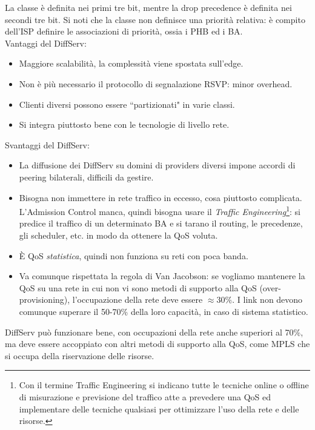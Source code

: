 La classe è definita nei primi tre bit, mentre la drop precedence è definita nei secondi tre bit. Si noti che la classe non definisce una priorità relativa: è compito dell'ISP definire le associazioni di priorità, ossia i PHB ed i BA.\\
Vantaggi del DiffServ:
\begin{itemize}
	\item Maggiore scalabilità, la complessità viene spostata sull'edge.
	\item Non è più necessario il protocollo di segnalazione RSVP: minor overhead.
	\item Clienti diversi possono essere \textquotedblleft partizionati" in varie classi.
	\item Si integra piuttosto bene con le tecnologie di livello rete.
\end{itemize}
Svantaggi del DiffServ:
\begin{itemize}
	\item La diffusione dei DiffServ su domini di providers diversi impone accordi di peering bilaterali, difficili da gestire.
	\item Bisogna non immettere in rete traffico in eccesso, cosa piuttosto complicata. L'Admission Control manca, quindi bisogna usare il \textit{Traffic Engineering}\footnote{Con il termine Traffic Engineering si indicano tutte le tecniche online o offline di misurazione e previsione del traffico atte a prevedere una QoS ed implementare delle tecniche qualsiasi per ottimizzare l'uso della rete e delle risorse.}: si predice il traffico di un determinato BA e si tarano il
	routing, le precedenze, gli scheduler, etc. in modo da ottenere la QoS voluta.
	\item È QoS \textit{statistica}, quindi non funziona su reti con poca banda.
	\item Va comunque rispettata la regola di Van Jacobson: se vogliamo mantenere la QoS su una rete in cui non vi sono metodi di supporto alla QoS (over-provisioning), l'occupazione della rete deve essere $\approx 30\%$. I link non devono comunque superare il 50-70\% della loro capacità, in caso di sistema statistico.
\end{itemize}
DiffServ può funzionare bene, con occupazioni della rete anche superiori al 70\%, ma deve essere accoppiato con altri metodi di supporto alla QoS, come MPLS che si occupa della riservazione delle risorse.

